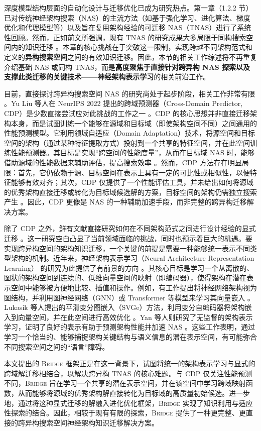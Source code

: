 \documentclass[../main.tex]{subfiles}
\begin{document}

深度模型结构层面的自动化设计与迁移优化已成为研究热点。第一章（1.2.2 节）已对传统神经架构搜索（NAS）的主流方法（如基于强化学习、进化算法、梯度优化和代理模型等）以及旨在复用架构经验的可迁移 NAS（TNAS）进行了系统性回顾。然而，正如前文所强调，现有 TNAS 的研究成果大多局限于同构搜索空间内的知识迁移 。本章的核心挑战在于突破这一限制，实现跨越不同架构范式和定义的\textbf{异构搜索空间}之间的有效知识迁移。因此，本节的相关工作综述将不再重复介绍基础 NAS 或同构 TNAS，而是\textbf{高度聚焦于直接针对跨异构 NAS 探索以及支撑此类迁移的关键技术——神经架构表示学习}的相关前沿工作。

目前，直接探讨跨异构搜索空间 NAS 的研究尚处于起步阶段，相关工作非常有限 。Yu Liu 等人在 NeurIPS 2022 提出的跨域预测器（Cross-Domain Predictor, CDP）是少数直接尝试应对此挑战的工作之一 。CDP 的核心思想并非直接迁移架构本身，而是试图训练一个能够在源域和目标域（即使架构空间不同）之间通用的性能预测模型。它利用领域自适应（Domain Adaptation）技术，将源空间和目标空间的架构（通过某种特征提取方式）投射到一个共享的特征空间，并在此空间训练性能预测器。其目标是实现“跨空间的性能度量”，从而在目标域 NAS 时，能够借助源域的性能数据来辅助评估，提高搜索效率 。然而，CDP 方法存在明显局限：首先，它仍依赖于源、目标空间在表示上具有一定的可比性或相似性，以便特征能够有效对齐；其次，CDP 仅提供了一个性能评估工具，并未给出如何将源域的优秀架构直接迁移或转化为目标域候选解的方案，目标空间的架构仍需独立搜索产生 。因此，CDP 更像是 NAS 的一种辅助加速手段，而非完整的跨异构迁移解决方案。

除了 CDP 之外，鲜有文献直接研究如何在不同架构范式之间进行设计经验的显式迁移 。这一研究空白凸显了当前领域面临的挑战，同时也预示着巨大的机遇。要实现跨异构空间的架构知识迁移，一个关键的前提是需要一种能够统一表示不同类型架构的机制。近年来，神经架构表示学习（Neural Architecture Representation Learning） 的研究为此提供了有前景的方向 。其核心目标是学习一个从离散的、图状的架构空间到连续的、低维向量空间的映射（即编码器），使得架构在潜在表示空间中能够被方便地比较、插值和操作。例如，有工作提出将神经网络架构视为图结构，并利用图神经网络（GNN）或 Transformer 等模型来学习其向量嵌入 。Lukasik 等人提出的平滑变分图嵌入（SVGe）方法，利用变分自编码器将架构嵌入到向量空间，并在此空间进行高效优化 。Yan 等人则研究了无监督的架构表示学习，证明了良好的表示有助于预测架构性能并加速 NAS 。这些工作表明，通过学习一个恰当的、能够捕捉架构关键结构与语义信息的潜在表示空间，有可能弥合不同搜索空间之间的“语言”障碍。

本文提出的 \textsc{Bridge} 框架正是在这一背景下，试图将统一的架构表示学习与显式的跨域解迁移相结合，以解决跨异构 TNAS 的核心难题。与 CDP 仅关注性能预测不同，\textsc{Bridge} 旨在学习一个共享的潜在表示空间，并在该空间中学习跨域映射函数，从而能够将源域的优秀架构解直接转化为目标域的高质量初始候选。进一步地，通过将这种显式迁移的解融入进化优化框架，\textsc{Bridge} 实现了知识利用与适应性探索的结合。因此，相较于现有有限的探索，\textsc{Bridge} 提供了一种更完整、更直接的跨异构搜索空间神经架构知识迁移解决方案。
\end{document}
